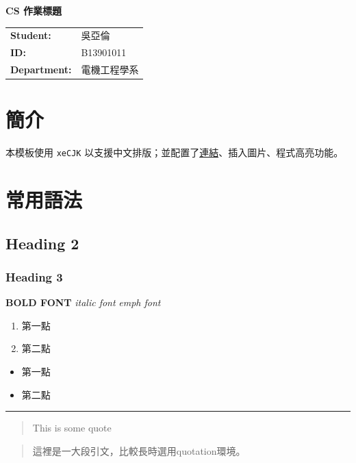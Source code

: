 \documentclass[12pt]{article}
\begin{document}
\thispagestyle{fancy} 


\begin{center}
    {\Large \bfseries CS 作業標題}
\end{center}

\vspace{2em}

\begin{tabular}{@{}l l}
\textbf{Student:} & 吳亞倫 \\
\textbf{ID:} & B13901011  \\
\textbf{Department:} & 電機工程學系
\end{tabular}
\bigskip

\tableofcontents
\clearpage

\section{簡介}
本模板使用 \texttt{xeCJK} 以支援中文排版；並配置了\href{https://youtu.be/dQw4w9WgXcQ}{連結}、插入圖片、程式高亮功能。

\section{常用語法}
\subsection{Heading 2}
\subsubsection{Heading 3}
\textbf{BOLD FONT}
\textit{italic font}
\emph{emph font}
\begin{enumerate}
  \item 第一點
  \item 第二點
\end{enumerate}
\begin{itemize}
  \item 第一點
  \item 第二點
\end{itemize}
\hrule
\begin{quote}
This is some quote
\end{quote}
\begin{quotation}
這裡是一大段引文，比較長時選用quotation環境。
\end{quotation}
\end{document}
